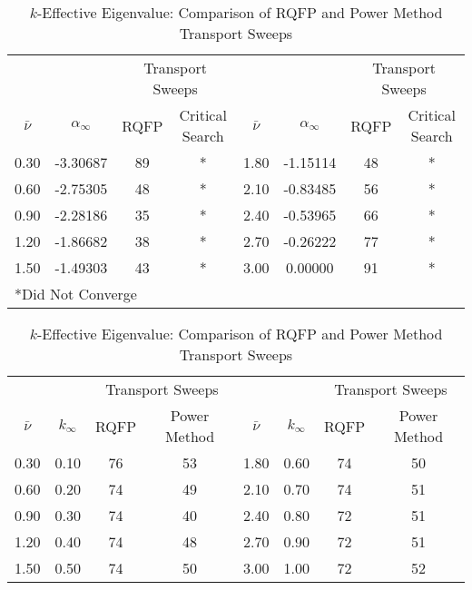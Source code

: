 \begin{table}[!htbp]
	    \caption{Reference Eigenvalues/Transport Sweeps for Convergence for Problem 5.2.1.1}
	\label{table:InfMedNu}
	\begin{subtable}[h]{1.0\textwidth}
	\centering{}
	\begin{tabular}{@{}cccccccc@{}}\toprule
	& & \multicolumn{2}{c}{Transport Sweeps} & & & \multicolumn{2}{c}{Transport Sweeps} \\
	\cmidrule{3-4} \cmidrule{7-8} $\bar{\nu}$ & $\alpha_{\infty}$ & RQFP & Critical Search \quad &  $\bar{\nu}$ & $\alpha_{\infty}$ & RQFP & Critical Search\\
	\midrule
0.30	&	-3.30687 &	89 & * & 1.80 & -1.15114 & 48 & * \\
0.60	&	-2.75305 &	48 & * & 2.10 & -0.83485 & 56 & * \\
0.90	&	-2.28186 &	35 & * & 2.40 & -0.53965 & 66 & * \\
1.20	&	-1.86682 &	38 & * & 2.70 & -0.26222 & 77 & * \\
1.50	&	-1.49303 &	43 & * & 3.00 & 0.00000  & 91 & * \\
	\bottomrule
	\multicolumn{8}{l}{*Did Not Converge} \\
	\end{tabular}
	\caption{Alpha-Eigenvalue: Comparison of RQFP and Critical Search Transport Sweeps}
	\label{table:AlphaSweepsInf}
	\end{subtable}%
	\vspace{0.25cm}
		\begin{subtable}[h]{1.0\textwidth}
	\centering{}
	\begin{tabular}{@{}cccccccc@{}}\toprule
	& & \multicolumn{2}{c}{Transport Sweeps} & & & \multicolumn{2}{c}{Transport Sweeps} \\
	\cmidrule{3-4} \cmidrule{7-8} $\bar{\nu}$ & $k_{\infty}$ & RQFP & Power Method \quad &  $\bar{\nu}$ & $k_{\infty}$ & RQFP & Power Method \\
	\midrule
0.30 & 0.10 & 76 & 53 & 1.80 & 0.60 & 74 & 50 \\
0.60 & 0.20 & 74 & 49 & 2.10 & 0.70 & 74 & 51 \\
0.90 & 0.30 & 74 & 40 & 2.40 & 0.80 & 72 & 51 \\
1.20 & 0.40 & 74 & 48 & 2.70 & 0.90 & 72 & 51 \\
1.50 & 0.50 & 74 & 50 & 3.00 & 1.00 & 72 & 52 \\
	\bottomrule
	\end{tabular}
	\caption{$k$-Effective Eigenvalue: Comparison of RQFP and Power Method Transport Sweeps}
	\label{table:kSweepsInf}
	\end{subtable}%
\end{table}

